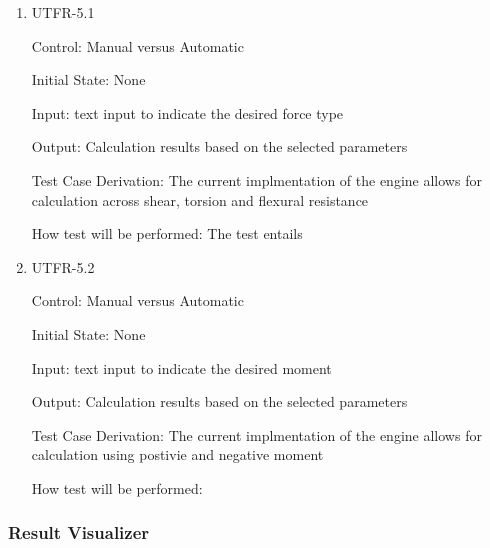 \documentclass[12pt, titlepage]{article}
\begin{document}
\begin{enumerate}

\item{UTFR-5.1\\}

Control: Manual versus Automatic
					
Initial State: None
					
Input: text input to indicate the desired force type  
					
Output: Calculation results based on the selected parameters 

Test Case Derivation: The current implmentation of the engine allows for calculation across shear, torsion and flexural resistance

How test will be performed: The test entails 
					
\item{UTFR-5.2\\}

Control: Manual versus Automatic
					
Initial State: None
					
Input: text input to indicate the desired moment  
					 
Output: Calculation results based on the selected parameters 

Test Case Derivation: The current implmentation of the engine allows for calculation using postivie and negative moment 

How test will be performed: 

\end{enumerate}

\subsubsection{Result Visualizer}
\end{document}
